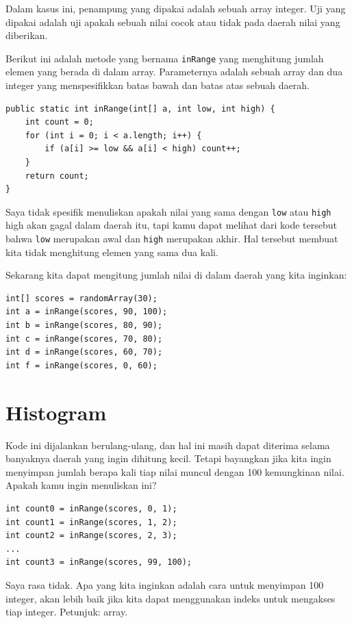 Dalam kasus ini, penampung yang dipakai adalah sebuah array integer. Uji yang dipakai adalah uji apakah sebuah nilai cocok atau tidak pada daerah nilai yang diberikan.

Berikut ini adalah metode yang bernama {\tt inRange} yang menghitung jumlah elemen yang berada di dalam array. Parameternya adalah sebuah array dan dua integer yang menspesifikkan batas bawah dan batas atas sebuah daerah.

\begin{lstlisting}
public static int inRange(int[] a, int low, int high) {
    int count = 0;
    for (int i = 0; i < a.length; i++) {
        if (a[i] >= low && a[i] < high) count++;
    }
    return count;
}
\end{lstlisting}
%
Saya tidak spesifik menuliskan apakah nilai yang sama dengan {\tt low} atau {\tt high} high akan gagal dalam daerah itu, tapi kamu dapat melihat dari kode tersebut bahwa {\tt low} merupakan awal dan {\tt high} merupakan akhir.
Hal tersebut membuat kita tidak menghitung elemen yang sama dua kali.

Sekarang kita dapat mengitung jumlah nilai di dalam daerah yang kita inginkan:

\begin{lstlisting}
int[] scores = randomArray(30);
int a = inRange(scores, 90, 100);
int b = inRange(scores, 80, 90);
int c = inRange(scores, 70, 80);
int d = inRange(scores, 60, 70);
int f = inRange(scores, 0, 60);
\end{lstlisting}


\section{Histogram}

Kode ini dijalankan berulang-ulang, dan hal ini masih dapat diterima selama banyaknya daerah yang ingin dihitung kecil. Tetapi bayangkan jika kita ingin menyimpan jumlah berapa kali tiap nilai muncul dengan 100 kemungkinan nilai. Apakah kamu ingin menuliskan ini?

\begin{lstlisting}
int count0 = inRange(scores, 0, 1);
int count1 = inRange(scores, 1, 2);
int count2 = inRange(scores, 2, 3);
...
int count3 = inRange(scores, 99, 100);
\end{lstlisting}

Saya rasa tidak. Apa yang kita inginkan adalah cara untuk menyimpan 100 integer, akan lebih baik jika kita dapat menggunakan indeks untuk mengakses tiap integer. Petunjuk: array.

